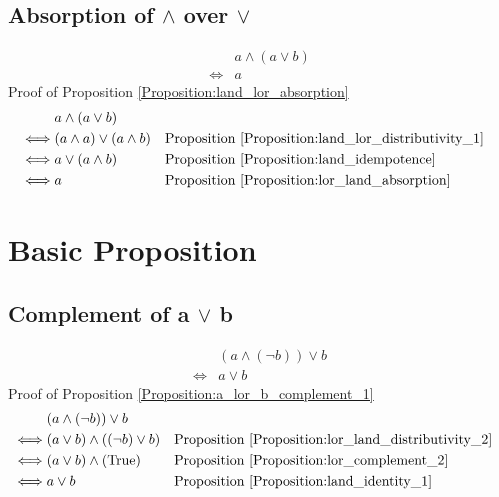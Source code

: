 \subsection{Absorption of $\land$ over $\lor$}
\begin{prop}
\label{Proposition:land_lor_absorption}
\begin{align*}
& a \land (a \lor b) \\
\iff & a
\end{align*}
Proof of Proposition \ref{Proposition:land_lor_absorption}
\begin{align*}
& a \land (a \lor b) \\
\iff & (a \land a) \lor (a \land b)
& & \text{Proposition \ref{Proposition:land_lor_distributivity_1}} \\
\iff & a \lor (a \land b)
& & \text{Proposition \ref{Proposition:land_idempotence}} \\
\iff & a
& & \text{Proposition \ref{Proposition:lor_land_absorption}} \\
\end{align*}
\end{prop}

\section{Basic Proposition}
\subsection{Complement of a $\lor$ b}
\begin{prop}
\label{Proposition:a_lor_b_complement_1}
\begin{align*}
& (a \land (\lnot b)) \lor b \\
\iff & a \lor b
\end{align*}
Proof of Proposition \ref{Proposition:a_lor_b_complement_1}
\begin{align*}
& (a \land (\lnot b)) \lor b \\
\iff & (a \lor b) \land ((\lnot b) \lor b)
& & \text{Proposition \ref{Proposition:lor_land_distributivity_2}} \\
\iff & (a \lor b) \land (\text{True})
& & \text{Proposition \ref{Proposition:lor_complement_2}} \\
\iff & a \lor b
& & \text{Proposition \ref{Proposition:land_identity_1}} \\
\end{align*}
\end{prop}

